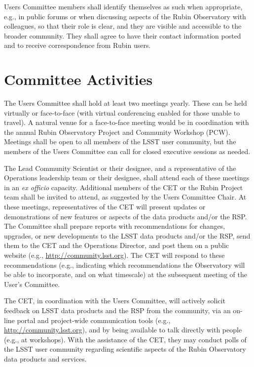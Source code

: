 \documentclass[OPS,toc]{lsstdoc}
\begin{document}
Users Committee members shall identify themselves as such when appropriate, e.g., in public forums or when discussing aspects of the Rubin Observatory with colleagues, so that their role is clear, and they are visible and accessible to the broader community.
They shall agree to have their contact information posted and to receive correspondence from Rubin users.

\section{Committee Activities}

The Users Committee shall hold at least two meetings yearly.
These can be held virtually or face-to-face (with virtual conferencing enabled for those unable to travel).
A natural venue for a face-to-face meeting would be in coordination with the annual Rubin Observatory Project and Community Workshop (PCW).
Meetings shall be open to all members of the LSST user community, but the members of the Users Committee can call for closed executive sessions as needed.  

The Lead Community Scientist or their designee, and a representative of the Operations leadership team or their designee, shall attend each of these meetings in an \textit{ex officio} capacity.
Additional members of the CET or the Rubin Project team shall be invited to attend, as suggested by the Users Committee Chair.
At these meetings, representatives of the CET will present updates or demonstrations of new features or aspects of the data products and/or the RSP.
The Committee shall prepare reports with recommendations for changes, upgrades, or new developments to the LSST data products and/or the RSP, send them to the CET and the Operations Director, and post them on a public website (e.g., \url{http://community.lsst.org}).
The CET will respond to these recommendations (e.g., indicating which recommendations the Observatory will be able to incorporate, and on what timescale) at the subsequent meeting of the User’s Committee.  

The CET, in coordination with the Users Committee, will actively solicit feedback on LSST data products and the RSP from the community, via an on-line portal and project-wide communication tools (e.g., \url{http://community.lsst.org}), and by being available to talk directly with people (e.g., at workshops).
With the assistance of the CET, they may conduct polls of the LSST user community regarding scientific aspects of the Rubin Observatory data products and services.
\end{document}
